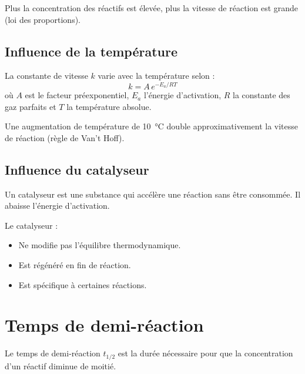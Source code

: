 \begin{propriete}
Plus la concentration des réactifs est élevée, plus la vitesse de réaction est grande (loi des proportions).
\end{propriete}

\subsection{Influence de la température}

\begin{loi}
La constante de vitesse $k$ varie avec la température selon :
\[
k = A\,e^{-E_a/RT}
\]
où $A$ est le facteur préexponentiel, $E_a$ l'énergie d'activation, $R$ la constante des gaz parfaits et $T$ la température absolue.
\end{loi}

\begin{propriete}
Une augmentation de température de \SI{10}{\celsius} double approximativement la vitesse de réaction (règle de Van't Hoff).
\end{propriete}

\subsection{Influence du catalyseur}

\begin{definition}[Catalyseur]
Un catalyseur est une substance qui accélère une réaction sans être consommée. Il abaisse l'énergie d'activation.
\end{definition}

\begin{aretenir}
Le catalyseur :
\begin{itemize}
\item Ne modifie pas l'équilibre thermodynamique.
\item Est régénéré en fin de réaction.
\item Est spécifique à certaines réactions.
\end{itemize}
\end{aretenir}

\section{Temps de demi-réaction}

\begin{definition}
Le temps de demi-réaction $t_{1/2}$ est la durée nécessaire pour que la concentration d'un réactif diminue de moitié.
\end{definition}

